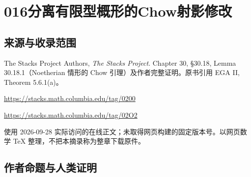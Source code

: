 \documentclass[UTF8,11pt]{ctexart}
\theoremstyle{definition}
\begin{document}
\section*{016\quad 分离有限型概形的Chow射影修改}
\subsection*{来源与收录范围}
The Stacks Project Authors, \emph{The Stacks Project}. Chapter 30, \S30.18, Lemma 30.18.1（Noetherian 情形的 Chow 引理）及作者完整证明。原书引用 EGA II, Theorem 5.6.1(a)。
\par\url{https://stacks.math.columbia.edu/tag/0200}
\par\url{https://stacks.math.columbia.edu/tag/02O2}
\par 使用 2026-09-28 实际访问的在线正文；未取得网页构建的固定版本号。以网页数学 TeX 整理，不把本摘录称为整章下载原件。
\subsection*{作者命题与人类证明}
\end{document}
